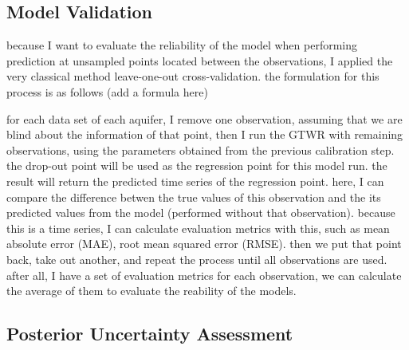 
\subsection{Model Validation}
\label{subsec:gtwr_validation}

because I want to evaluate the reliability of the model when performing prediction at unsampled points located between the observations, I applied the very classical method leave-one-out cross-validation. the formulation for this process is as follows (add a formula here)

for each data set of each aquifer, I remove one observation, assuming that we are blind about the information of that point, then I run the GTWR with remaining observations, using the parameters obtained from the previous calibration step. the drop-out point will be used as the regression point for this model run. the result will return the predicted time series of the regression point. here, I can compare the difference betwen the true values of this observation and the its predicted values from the model (performed without that observation). because this is a time series, I can calculate evaluation metrics with this, such as mean absolute error (MAE), root mean squared error (RMSE). then we put that point back, take out another, and repeat the process until all observations are used. after all, I have a set of evaluation metrics for each observation, we can calculate the average of them to evaluate the reability of the models.


\subsection{Posterior Uncertainty Assessment}


